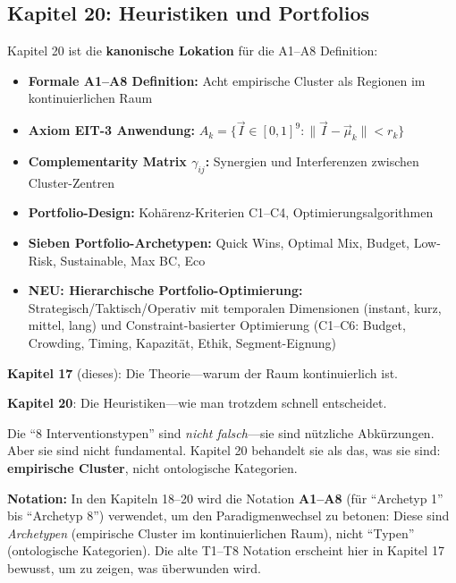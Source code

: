 \subsection{Kapitel 20: Heuristiken und Portfolios}
\label{sec:17-ch20}

Kapitel 20 ist die \textbf{kanonische Lokation} f\"{u}r die A1--A8 Definition:
\begin{itemize}[nosep]
\item \textbf{Formale A1--A8 Definition:} Acht empirische Cluster als Regionen im kontinuierlichen Raum
\item \textbf{Axiom EIT-3 Anwendung:} $A_k = \{\vec{I} \in [0,1]^9 : \|\vec{I} - \vec{\mu}_k\| < r_k\}$
\item \textbf{Complementarity Matrix $\gamma_{ij}$:} Synergien und Interferenzen zwischen Cluster-Zentren
\item \textbf{Portfolio-Design:} Kohärenz-Kriterien C1--C4, Optimierungsalgorithmen
\item \textbf{Sieben Portfolio-Archetypen:} Quick Wins, Optimal Mix, Budget, Low-Risk, Sustainable, Max BC, Eco
\item \textbf{NEU: Hierarchische Portfolio-Optimierung:} Strategisch/Taktisch/Operativ mit temporalen Dimensionen (instant, kurz, mittel, lang) und Constraint-basierter Optimierung (C1--C6: Budget, Crowding, Timing, Kapazit\"{a}t, Ethik, Segment-Eignung)
\end{itemize}

\begin{tcolorbox}[colback=yellow!5!white, colframe=yellow!75!black,
    title=\textbf{Wichtige Abgrenzung}]

\textbf{Kapitel 17} (dieses): Die Theorie---warum der Raum kontinuierlich ist.

\textbf{Kapitel 20}: Die Heuristiken---wie man trotzdem schnell entscheidet.

Die ``8 Interventionstypen'' sind \textit{nicht falsch}---sie sind n\"{u}tzliche Abk\"{u}rzungen. Aber sie sind nicht fundamental. Kapitel 20 behandelt sie als das, was sie sind: \textbf{empirische Cluster}, nicht ontologische Kategorien.

\textbf{Notation:} In den Kapiteln 18--20 wird die Notation \textbf{A1--A8} (f\"{u}r ``Archetyp 1'' bis ``Archetyp 8'') verwendet, um den Paradigmenwechsel zu betonen: Diese sind \textit{Archetypen} (empirische Cluster im kontinuierlichen Raum), nicht ``Typen'' (ontologische Kategorien). Die alte T1--T8 Notation erscheint hier in Kapitel 17 bewusst, um zu zeigen, was \"{u}berwunden wird.

\end{tcolorbox}


